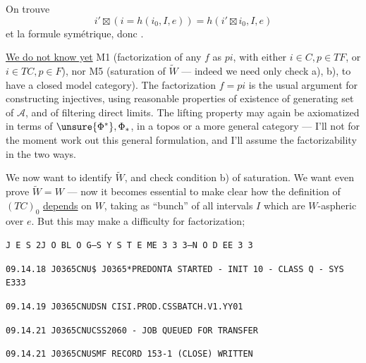 
On trouve
\[
i'\boxtimes(i=h(i_0,I,e))=h(i'\boxtimes i_0,I,e)
\]
et la formule symétrique, donc .

\uline{We do not know yet} M1 (factorization of any $f$ as $pi$, with either $i\in C,p\in TF$, or $i\in TC,p\in F$), nor M5 (saturation of $\widetilde W$ --- indeed we need only check a), b), to have a closed model category). The factorization $f=pi$ is the usual argument for constructing injectives, using reasonable properties of existence of  generating set of $\mathcal A$, and of filtering direct limits.
The lifting property may again be axiomatized in terms of $\unsure{\Phi^*},\Phi_*$, in a topos or a more general category --- I'll not for the moment work out this general formulation, and  I'll assume the factorizability  in the two ways.

We now want to identify $\widetilde W$, and check condition b) of saturation. We want even prove $\widetilde W=W$ --- now it becomes essential to  make clear how the definition of $(TC)_0$ \uline{depends} on $W$, taking as ``bunch'' of  all intervals $I$ which are $W$-aspheric over $e$. But this may make a difficulty for factorization;

\texttt{J E S 2\quad J O B\quad L O G\quad --\quad S Y S T E M\quad E 3 3 3\quad --\quad N O D E\quad E 3 3}

\texttt{09.14.18 J0365CNU\quad \$ J0365*PREDONTA STARTED - INIT 10 - CLASS Q - SYS E333}

\texttt{09.14.19 J0365CNU\quad DSN CISI.PROD.CSSBATCH.V1.YY01}

\texttt{09.14.21 J0365CNU\quad CSS2060 - JOB QUEUED FOR TRANSFER}

\texttt{09.14.21 J0365CNU\quad SMF RECORD 153-1 (CLOSE) WRITTEN}

